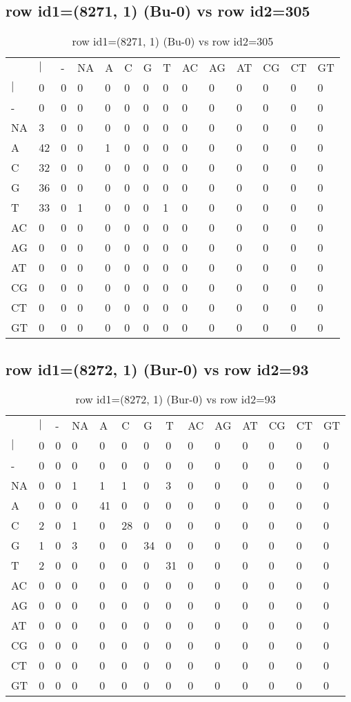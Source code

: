 \subsection{row id1=(8271, 1) (Bu-0) vs row id2=305}
\begin{center}
\begin{longtable}{|l|l|l|l|l|l|l|l|l|l|l|l|l|l|}
\caption{row id1=(8271, 1) (Bu-0) vs row id2=305} \label{table_dm420}\\
\hline
\\
\hline
&$|$&-&NA&A&C&G&T&AC&AG&AT&CG&CT&GT\\
$|$&0&0&0&0&0&0&0&0&0&0&0&0&0\\
-&0&0&0&0&0&0&0&0&0&0&0&0&0\\
NA&3&0&0&0&0&0&0&0&0&0&0&0&0\\
A&42&0&0&1&0&0&0&0&0&0&0&0&0\\
C&32&0&0&0&0&0&0&0&0&0&0&0&0\\
G&36&0&0&0&0&0&0&0&0&0&0&0&0\\
T&33&0&1&0&0&0&1&0&0&0&0&0&0\\
AC&0&0&0&0&0&0&0&0&0&0&0&0&0\\
AG&0&0&0&0&0&0&0&0&0&0&0&0&0\\
AT&0&0&0&0&0&0&0&0&0&0&0&0&0\\
CG&0&0&0&0&0&0&0&0&0&0&0&0&0\\
CT&0&0&0&0&0&0&0&0&0&0&0&0&0\\
GT&0&0&0&0&0&0&0&0&0&0&0&0&0\\
\hline
\end{longtable}
\end{center}

\subsection{row id1=(8272, 1) (Bur-0) vs row id2=93}
\begin{center}
\begin{longtable}{|l|l|l|l|l|l|l|l|l|l|l|l|l|l|}
\caption{row id1=(8272, 1) (Bur-0) vs row id2=93} \label{table_dm422}\\
\hline
\\
\hline
&$|$&-&NA&A&C&G&T&AC&AG&AT&CG&CT&GT\\
$|$&0&0&0&0&0&0&0&0&0&0&0&0&0\\
-&0&0&0&0&0&0&0&0&0&0&0&0&0\\
NA&0&0&1&1&1&0&3&0&0&0&0&0&0\\
A&0&0&0&41&0&0&0&0&0&0&0&0&0\\
C&2&0&1&0&28&0&0&0&0&0&0&0&0\\
G&1&0&3&0&0&34&0&0&0&0&0&0&0\\
T&2&0&0&0&0&0&31&0&0&0&0&0&0\\
AC&0&0&0&0&0&0&0&0&0&0&0&0&0\\
AG&0&0&0&0&0&0&0&0&0&0&0&0&0\\
AT&0&0&0&0&0&0&0&0&0&0&0&0&0\\
CG&0&0&0&0&0&0&0&0&0&0&0&0&0\\
CT&0&0&0&0&0&0&0&0&0&0&0&0&0\\
GT&0&0&0&0&0&0&0&0&0&0&0&0&0\\
\hline
\end{longtable}
\end{center}

